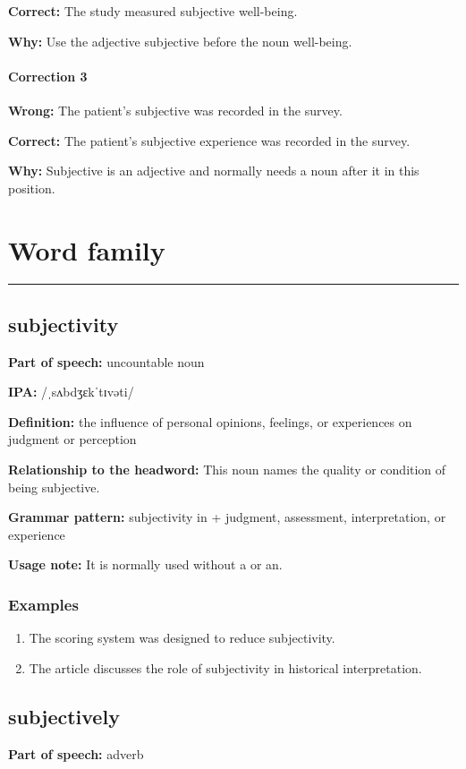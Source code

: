 \documentclass[11pt]{article}
\newcommand{\sectionrule}{\par\vspace{-0.5em}\noindent\textcolor{Accent}{\rule{\linewidth}{0.6pt}}\par}
\begin{document}
\textbf{Correct:} The study measured subjective well-being.

\textbf{Why:} Use the adjective subjective before the noun well-being.

\paragraph{Correction 3}
\textbf{Wrong:} The patient's subjective was recorded in the survey.

\textbf{Correct:} The patient's subjective experience was recorded in the survey.

\textbf{Why:} Subjective is an adjective and normally needs a noun after it in this position.

\section{Word family}
\sectionrule
\subsection{subjectivity}
\textbf{Part of speech:} uncountable noun

\textbf{IPA:} /ˌsʌbdʒɛkˈtɪvəti/

\textbf{Definition:} the influence of personal opinions, feelings, or experiences on judgment or perception

\textbf{Relationship to the headword:} This noun names the quality or condition of being subjective.

\textbf{Grammar pattern:} subjectivity in + judgment, assessment, interpretation, or experience

\textbf{Usage note:} It is normally used without a or an.

\subsubsection{Examples}
\begin{enumerate}
  \item The scoring system was designed to reduce subjectivity.
  \item The article discusses the role of subjectivity in historical interpretation.
\end{enumerate}

\subsection{subjectively}
\textbf{Part of speech:} adverb
\end{document}
